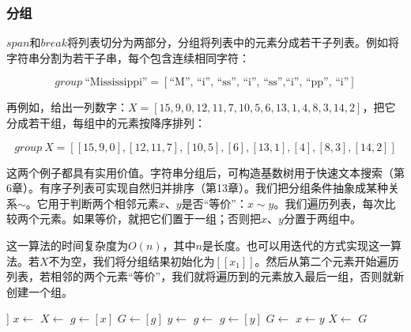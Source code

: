 \documentclass[b5paper]{ctexart}
\begin{document}
\subsubsection{分组}

$span$和$break$将列表切分为两部分，分组将列表中的元素分成若干子列表。例如将字符串分割为若干子串，每个包含连续相同字符：

\[
\textit{group}\ \text{``Mississippi''} = [\text{``M'', ``i'', ``ss'', ``i'', ``ss'',``i'', ``pp'', ``i''}]
\]

再例如，给出一列数字：$X = [15, 9, 0, 12, 11, 7, 10, 5, 6, 13, 1, 4, 8, 3, 14, 2]$，把它分成若干组，每组中的元素按降序排列：

\[
\textit{group}\ X = [[15, 9, 0], [12, 11, 7], [10, 5], [6], [13, 1], [4], [8, 3], [14, 2]]
\]

这两个例子都具有实用价值。字符串分组后，可构造基数树用于快速文本搜索（第6章）。有序子列表可实现自然归并排序（第13章）。我们把分组条件抽象成某种关系$\sim$。它用于判断两个相邻元素$x$、$y$是否“等价”：$x \sim y$。我们遍历列表，每次比较两个元素。如果等价，就把它们置于一组；否则把$x$、$y$分置于两组中。

\be
{}
\ee

这一算法的时间复杂度为$O(n)$，其中$n$是长度。也可以用迭代的方式实现这一算法。若$X$不为空，我们将分组结果初始化为$[[x_1]]$。然后从第二个元素开始遍历列表，若相邻的两个元素“等价”，我们就将遍历到的元素放入最后一组，否则就新创建一个组。

\begin{algorithmic}[1]
    \State \Return [[\ ]]
  \EndIf
  \State $x \gets$ 
  \State $X \gets$ 
  \State $g \gets [x]$
  \State $G \gets [g]$
    \State $y \gets$ 
      \State $g \gets $ 
    \Else
      \State $g \gets [y]$
      \State $G \gets$ 
    \EndIf
    \State $x \gets y$
    \State $X \gets$ 
  \EndWhile
  \State \Return $G$
\EndFunction
\end{algorithmic}
\end{document}
